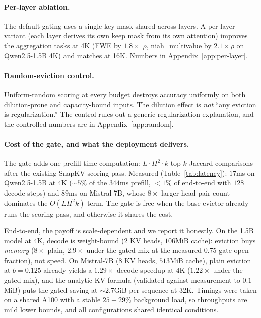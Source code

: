 \paragraph{Per-layer ablation.} The default gating uses a single
key-mask shared across layers. A
per-layer variant (each layer derives its own keep mask from its own
attention) improves the aggregation tasks at 4K (FWE by $1.8 \times$
$\rho$, niah\_multivalue by $2.1 \times \rho$ on Qwen2.5-1.5B 4K) and
matches at 16K. Numbers in Appendix~\ref{app:per-layer}.

\paragraph{Random-eviction control.} Uniform-random scoring at every
budget destroys accuracy uniformly on
both dilution-prone and capacity-bound inputs. The dilution effect is
\emph{not} ``any eviction is regularization.'' The control rules out a
generic regularization explanation, and the controlled numbers are in
Appendix~\ref{app:random}.

\paragraph{Cost of the gate, and what the deployment delivers.}
The gate adds one prefill-time computation: $L \cdot H^2 \cdot k$
top-$k$ Jaccard comparisons after the existing SnapKV scoring pass.
Measured (Table~\ref{tab:latency}): $17$ms on Qwen2.5-1.5B at 4K
($\sim 5\%$ of the $344$ms prefill, $< 1\%$ of end-to-end with $128$
decode steps) and $89$ms on Mistral-7B, whose $8\times$ larger
head-pair count dominates the $O(L H^2 k)$ term. The gate is free when
the base evictor already runs the scoring pass, and otherwise it shares
the cost.

End-to-end, the payoff is scale-dependent and we report it honestly.
On the 1.5B model at 4K, decode is weight-bound (2 KV heads, $106$MiB
cache): eviction buys \emph{memory} ($8\times$ plain, $2.9\times$
under the gated mix at the measured $0.75$ gate-open fraction), not
speed. On Mistral-7B (8 KV heads, $513$MiB cache), plain eviction at
$b = 0.125$ already yields a $1.29\times$ decode speedup at 4K
($1.22\times$ under the gated mix), and the analytic KV formula
(validated against measurement to $0.1$MiB) puts the gated saving at
$\sim 2.7$GiB per sequence at 32K. Timings were taken on a shared
A100 with a stable $25 - 29\%$ background load, so throughputs are
mild lower bounds, and all configurations shared identical conditions.

